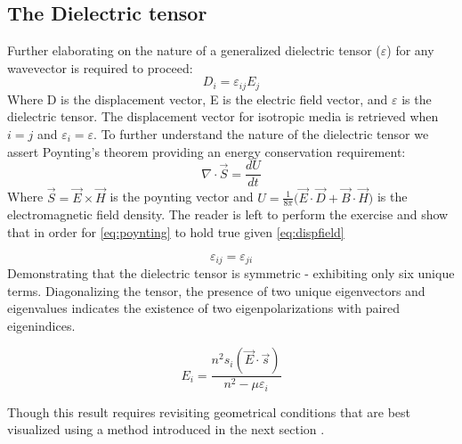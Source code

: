 \subsection{The Dielectric tensor} \label{appendix:Diel_tensor}
Further elaborating on the nature of a generalized dielectric tensor ($\varepsilon$) for any wavevector is required to proceed:
\begin{equation}\label{eq:dispfield}
D_i = \varepsilon_{ij}E_j
\end{equation}
Where D is the displacement vector, E is the electric field vector, and $\varepsilon$ is the dielectric tensor. The displacement vector for isotropic media is retrieved when $i = j$ and $\varepsilon_i = \varepsilon$. To further understand the nature of the dielectric tensor we assert Poynting's theorem providing an energy conservation requirement:
\begin{equation}\label{eq:poynting}
\nabla \cdot \vec{S} = \frac{dU}{dt}
\end{equation}
Where $\vec{S} = \vec{E} \times \vec{H}$ is the poynting vector and $U = \frac{1}{8 \pi} \big( \vec{E} \cdot \vec{D} + \vec{B} \cdot \vec{H} \big)$ is the electromagnetic field density. The reader is left to perform the exercise and show that in order for \autoref{eq:poynting} to hold true given \autoref{eq:dispfield}


\begin{equation}
\varepsilon_{ij} = \varepsilon_{ji}
\end{equation}
Demonstrating that the dielectric tensor is symmetric - exhibiting only six unique terms. Diagonalizing the tensor, the presence of two unique eigenvectors and eigenvalues indicates the existence of two eigenpolarizations with paired eigenindices.

\begin{equation}\label{eq:modelec}
E_i = \frac{n^2 s_i (\vec{E}\cdot\vec{s})}{n^2 - \mu \varepsilon_i}
\end{equation}

Though this result requires revisiting geometrical conditions that are best visualized using a method introduced in the next section \cite{nye}. 





